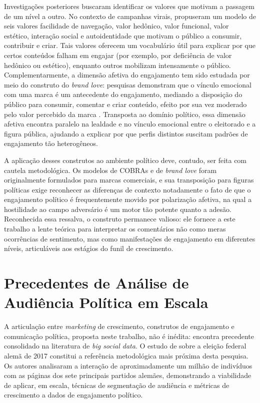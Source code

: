 Investigações posteriores buscaram identificar os valores que motivam a passagem de um nível a outro. No contexto de campanhas virais,  propuseram um modelo de seis valores \textemdash{} facilidade de navegação, valor hedônico, valor funcional, valor estético, interação social e autoidentidade \textemdash{} que motivam o público a consumir, contribuir e criar. Tais valores oferecem um vocabulário útil para explicar por que certos conteúdos falham em engajar (por exemplo, por deficiência de valor hedônico ou estético), enquanto outros mobilizam intensamente o público. Complementarmente, a dimensão afetiva do engajamento tem sido estudada por meio do construto do \emph{brand love}: pesquisas demonstram que o vínculo emocional com uma marca é um antecedente do engajamento, mediando a disposição do público para consumir, comentar e criar conteúdo, efeito por sua vez moderado pelo valor percebido da marca \cite{castrogonzalez2025}. Transposta ao domínio político, essa dimensão afetiva encontra paralelo na lealdade e no vínculo emocional entre o eleitorado e a figura pública, ajudando a explicar por que perfis distintos suscitam padrões de engajamento tão heterogêneos.

A aplicação desses construtos ao ambiente político deve, contudo, ser feita com cautela metodológica. Os modelos de COBRAs e de \emph{brand love} foram originalmente formulados para marcas comerciais, e sua transposição para figuras políticas exige reconhecer as diferenças de contexto \textemdash{} notadamente o fato de que o engajamento político é frequentemente movido por polarização afetiva, na qual a hostilidade ao campo adversário é um motor tão potente quanto a adesão. Reconhecida essa ressalva, o construto permanece valioso: ele fornece a este trabalho a lente teórica para interpretar os comentários não como meras ocorrências de sentimento, mas como manifestações de engajamento em diferentes níveis, articuláveis aos estágios do funil de crescimento.

\section{Precedentes de Análise de Audiência Política em Escala}

A articulação entre \emph{marketing} de crescimento, construtos de engajamento e comunicação política, proposta neste trabalho, não é inédita: encontra precedente consolidado na literatura de \emph{big social data}. O estudo de  sobre a eleição federal alemã de 2017 constitui a referência metodológica mais próxima desta pesquisa. Os autores analisaram a interação de aproximadamente um milhão de indivíduos com as páginas dos sete principais partidos alemães, demonstrando a viabilidade de aplicar, em escala, técnicas de segmentação de audiência e métricas de crescimento a dados de engajamento político.

